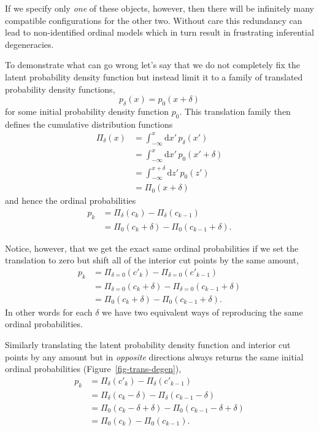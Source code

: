 \documentclass[
  letterpaper,
  DIV=11,
  numbers=noendperiod]{scrartcl}
\begin{document}
If we specify only \emph{one} of these objects, however, then there will
be infinitely many compatible configurations for the other two. Without
care this redundancy can lead to non-identified ordinal models which in
turn result in frustrating inferential degeneracies.

To demonstrate what can go wrong let's say that we do not completely fix
the latent probability density function but instead limit it to a family
of translated probability density functions, \[
p_{\delta}(x) = p_{0}(x + \delta)
\] for some initial probability density function \(p_{0}\). This
translation family then defines the cumulative distribution functions
\begin{align*}
\Pi_{\delta}(x)
&=
\int_{-\infty}^{x} \mathrm{d} x' \, p_{\delta}(x')
\\
&=
\int_{-\infty}^{x} \mathrm{d} x' \, p_{0}(x' + \delta)
\\
&=
\int_{-\infty}^{x + \delta} \mathrm{d} z' \, p_{0} \left( z' \right)
\\
&=
\Pi_{0} ( x + \delta )
\end{align*} and hence the ordinal probabilities \begin{align*}
p_{k}
&=
\Pi_{\delta}(c_{k}) - \Pi_{\delta}(c_{k - 1})
\\
&=
  \Pi_{0} ( c_{k}     + \delta )
- \Pi_{0} ( c_{k - 1} + \delta ).
\end{align*}

Notice, however, that we get the exact same ordinal probabilities if we
set the translation to zero but shift all of the interior cut points by
the same amount, \begin{align*}
p_{k}
&=
  \Pi_{\delta = 0}( c'_{k}     )
- \Pi_{\delta = 0}( c'_{k - 1} )
\\
&=
  \Pi_{\delta = 0}( c_{k}     + \delta )
- \Pi_{\delta = 0}( c_{k - 1} + \delta )
\\
&=
  \Pi_{0} ( c_{k}     + \delta )
- \Pi_{0} ( c_{k - 1} + \delta ).
\end{align*} In other words for each \(\delta\) we have two equivalent
ways of reproducing the same ordinal probabilities.

Similarly translating the latent probability density function and
interior cut points by any amount but in \emph{opposite} directions
always returns the same initial ordinal probabilities
(Figure~\ref{fig-trans-degen}), \begin{align*}
p_{k}
&=
  \Pi_{\delta}(c'_{k}     )
- \Pi_{\delta}(c'_{k - 1} )
\\
&=
  \Pi_{\delta}(c_{k}     - \delta)
- \Pi_{\delta}(c_{k - 1} - \delta)
\\
&=
  \Pi_{0} ( c_{k}     - \delta + \delta )
- \Pi_{0} ( c_{k - 1} - \delta + \delta )
\\
&=
  \Pi_{0} ( c_{k}     )
- \Pi_{0} ( c_{k - 1} ).
\end{align*}
\end{document}
